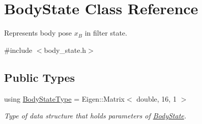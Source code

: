 \hypertarget{class_body_state}{\section{Body\-State Class Reference}
\label{class_body_state}
}


Represents body pose $x_B$ in filter state.  




{\ttfamily \#include $<$body\-\_\-state.\-h$>$}

\subsection*{Public Types}
\begin{DoxyCompactItemize}
\item 
\hypertarget{class_body_state_ac95355c4974335a6f69da770d2de30e0}{using \hyperlink{class_body_state_ac95355c4974335a6f69da770d2de30e0}{Body\-State\-Type} = Eigen\-::\-Matrix$<$ double, 16, 1 $>$}\label{class_body_state_ac95355c4974335a6f69da770d2de30e0}

\begin{DoxyCompactList}\small\item\em Type of data structure that holds parameters of \hyperlink{class_body_state}{Body\-State}. \end{DoxyCompactList}\end{DoxyCompactItemize}
